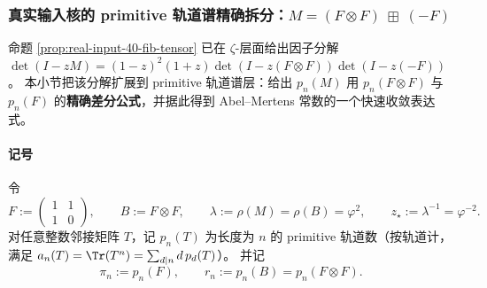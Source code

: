 \subsubsection{真实输入核的 primitive 轨道谱精确拆分：\texorpdfstring{$M=(F\otimes F)\ \boxplus\ (-F)$}{M=(F⊗F) boxplus (-F)}}\label{subsec:real-input-40-prime-splitting}
命题 \ref{prop:real-input-40-fib-tensor} 已在 \(\zeta\)-层面给出因子分解
\(
\det(I-zM)=(1-z)^2(1+z)\det(I-z(F\otimes F))\det(I-z(-F))
\)。
本小节把该分解扩展到 primitive 轨道谱层：给出 \(p_n(M)\) 用 \(p_n(F\otimes F)\) 与 \(p_n(F)\) 的\textbf{精确差分公式}，并据此得到 Abel--Mertens 常数的一个快速收敛表达式。

\paragraph{记号}
令
\[
F:=\begin{pmatrix}1&1\\[2pt]1&0\end{pmatrix},\qquad
B:=F\otimes F,
\qquad
\lambda:=\rho(M)=\rho(B)=\varphi^2,
\qquad
z_\star:=\lambda^{-1}=\varphi^{-2}.
\]
对任意整数邻接矩阵 \(T\)，记 \(p_n(T)\) 为长度为 \(n\) 的 primitive 轨道数（按轨道计，满足 \(a_n(T)=\Tr(T^n)=\sum_{d\mid n} d\,p_d(T)\)）。
并记
\[
\pi_n:=p_n(F),\qquad r_n:=p_n(B)=p_n(F\otimes F).
\]

